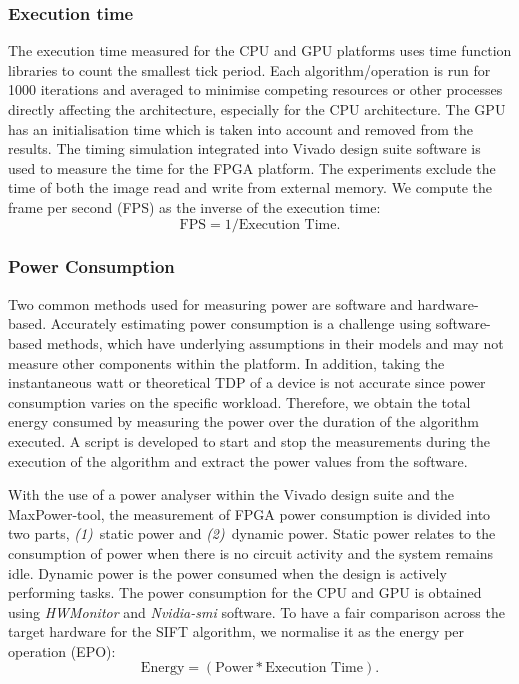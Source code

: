 \subsubsection{Execution time}
The execution time measured for the CPU and GPU platforms uses time function libraries to count the smallest tick period. Each algorithm/operation is run for 1000 iterations and averaged to minimise competing resources or other processes directly affecting the architecture, especially for the CPU architecture. The GPU has an initialisation time which is taken into account and removed from the results. The timing simulation integrated into Vivado design suite software is used to measure the time for the FPGA platform. The experiments exclude the time of both the image read and write from external memory. We compute the frame per second (FPS) as the inverse of the execution time: 
\begin{equation}\label{eq:FPS}
\text{FPS}= 1/\text{Execution Time}.
\end{equation}

\subsubsection{Power Consumption}
Two common methods used for measuring power are software and hardware-based. Accurately estimating power consumption is a challenge using software-based methods, which have underlying assumptions in their models and may not measure other components within the platform. In addition, taking the instantaneous watt or theoretical TDP of a device is not accurate since power consumption varies on the specific workload. Therefore, we obtain the total energy consumed by measuring the power over the duration of the algorithm executed. A script is developed to start and stop the measurements during the execution of the algorithm and extract the power values from the software. 

With the use of a power analyser within the Vivado design suite and the MaxPower-tool, the measurement of FPGA power consumption is divided into two parts, \textit{(1)}~static power and \textit{(2)}~dynamic power. Static power relates to the consumption of power when there is no circuit activity and the system remains idle. Dynamic power is the power consumed when the design is actively performing tasks. The power consumption for the CPU and GPU is obtained using \textit{HWMonitor} and \textit{Nvidia-smi} software.
To have a fair comparison across the target hardware for the SIFT algorithm, we normalise it as the energy per operation (EPO):
\begin{equation}\label{eq:energy1}
\text{Energy} = (\text{Power} * \text{Execution Time}).    
\end{equation}

